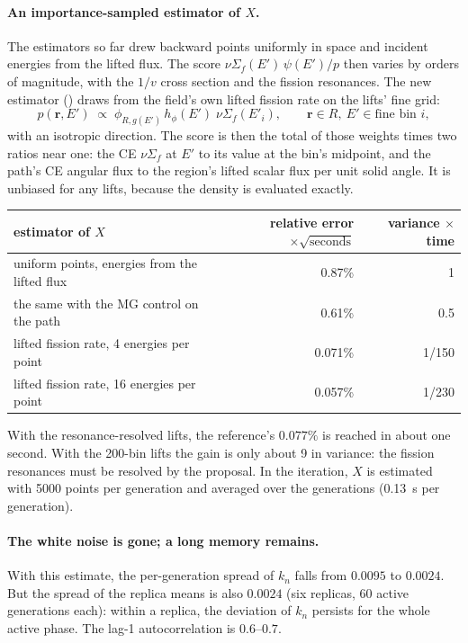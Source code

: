 \paragraph{An importance-sampled estimator of $X$.} The estimators so far drew backward points
uniformly in space and incident energies from the lifted flux. The score
$\nu\Sigma_f(E')\,\psi(E')/p$ then varies by orders of magnitude, with the $1/v$ cross section and
the fission resonances. The new estimator () draws from the field's
own lifted fission rate on the lifts' fine grid:
\begin{equation}
p(\mathbf r,E')\;\propto\;\phi_{R,g(E')}\,h_\phi(E')\;\nu\Sigma_f(E'_i),\qquad \mathbf r\in R,\ E'\in\text{fine bin }i,
\end{equation}
with an isotropic direction. The score is then the total of those weights times two ratios near
one: the CE $\nu\Sigma_f$ at $E'$ to its value at the bin's midpoint, and the path's CE angular
flux to the region's lifted scalar flux per unit solid angle. It is unbiased for any lifts, because
the density is evaluated exactly.

\begin{center}\small
\begin{tabular}{@{}lrr@{}}
\toprule
estimator of $X$ & relative error $\times\sqrt{\text{seconds}}$ & variance $\times$ time\\
\midrule
uniform points, energies from the lifted flux & 0.87\% & 1\\
the same with the MG control on the path & 0.61\% & 0.5\\
lifted fission rate, 4 energies per point & 0.071\% & 1/150\\
lifted fission rate, 16 energies per point & 0.057\% & 1/230\\
\bottomrule
\end{tabular}
\end{center}
With the resonance-resolved lifts, the reference's $0.077\%$ is reached in about one second. With
the 200-bin lifts the gain is only about 9 in variance: the fission resonances must be resolved by
the proposal. In the iteration, $X$ is estimated with 5000 points per generation and averaged over
the generations (0.13~s per generation).

\paragraph{The white noise is gone; a long memory remains.} With this estimate, the per-generation
spread of $k_n$ falls from $0.0095$ to $0.0024$. But the spread of the replica means is also
$0.0024$ (six replicas, 60 active generations each): within a replica, the deviation of $k_n$
persists for the whole active phase. The lag-1 autocorrelation is $0.6$--$0.7$.

